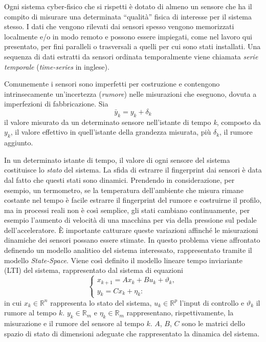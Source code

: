\documentclass[Lau,binding=0.6cm,noexaminfo]{sapthesis}
\begin{document}
Ogni sistema cyber-fisico che si rispetti è dotato di almeno un sensore che ha il compito di misurare una determinata ``qualità'' fisica di interesse per il sistema stesso. 
I dati che vengono rilevati dai sensori spesso vengono memorizzati localmente e/o in modo remoto e possono essere impiegati,
come nel lavoro qui presentato, per fini paralleli o trasversali a quelli per cui sono stati installati.
Una sequenza di dati estratti da sensori ordinata temporalmente viene chiamata \textit{serie temporale} (\textit{time-series} in inglese).

Comunemente i sensori sono imperfetti per costruzione e contengono intrinsecamente un'incertezza (\textit{rumore}) nelle misurazioni che eseguono, dovuta a imperfezioni di fabbricazione.
Sia 
\begin{equation}
\bar{y}_{k} = y_{k} + \delta_{k}\label{eq:1}
\end{equation}
il valore misurato da un determinato sensore nell'istante di tempo \textit{k}, composto da $y_k$, il valore effettivo in quell'istante della grandezza misurata, più $\delta_k$, il rumore aggiunto.

In un determinato istante di tempo, il valore di ogni sensore del sistema costituisce lo \textit{stato} del sistema.
La sfida di estrarre il fingerprint dai sensori è data dal fatto che questi stati sono dinamici. 
Prendendo in considerazione, per esempio, un termometro, se la temperatura dell'ambiente che misura rimane costante nel tempo è facile estrarre il fingerprint del rumore e costruirne il profilo, 
ma in processi reali non è così semplice, gli stati cambiano continuamente, per esempio l'aumento di velocità di una macchina per via della pressione sul pedale dell'acceleratore.
\`E importante catturare queste variazioni affinch\'e le misurazioni dinamiche dei sensori possano essere stimate.
In \cite{ahmed2018noise} questo problema viene affrontato definendo un modello analitico del sistema interessato, rappresentato tramite il modello \textit{State-Space}. 
Viene cos\`i definito il modello lineare tempo inviariante (LTI) del sistema, rappresentato dal sistema di equazioni
\begin{equation}\label{eq:4}
    \begin{cases}
        x_{k+1} = Ax_k + Bu_k + \vartheta_k, \\
        y_k = Cx_k + \eta_k:
    \end{cases}
\end{equation}
in cui $x_k \in \mathbb{R}^n$ rappresenta lo stato del sistema, $u_k \in \mathbb{R}^p$ l'input di controllo e
$\vartheta_k$ il rumore al tempo $k$.
$y_k \in \mathbb{R}_m$ e $\eta_k \in \mathbb{R}_m$ rappresentano, rispettivamente, la misurazione e il rumore del sensore al tempo $k$.
$A$, $B$, $C$ sono le matrici dello spazio di stato di dimensioni adeguate che rappresentato la dinamica del sistema.
\end{document}
